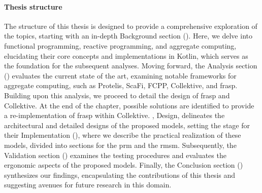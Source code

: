 \paragraph{Thesis structure}

The structure of this thesis is designed to provide a comprehensive exploration of the topics, starting with an in-depth Background section (). Here, we delve into functional programming, reactive programming, and aggregate computing, elucidating their core concepts and implementations in Kotlin, which serves as the foundation for the subsequent analyses. Moving forward, the Analysis section () evaluates the current state of the art, examining notable frameworks for aggregate computing, such as Protelis, ScaFi, FCPP, Collektive, and \ac{frasp}. Building upon this analysis, we proceed to detail the design of \ac{frasp} and Collektive. At the end of the chapter, possible solutions are identified to provide a re-implementation of \ac{frasp} within Collektive. , Design, delineates the architectural and detailed designs of the proposed models, setting the stage for their Implementation (), where we describe the practical realization of these models, divided into sections for the \ac{prm} and the \ac{rmsm}. Subsequently, the Validation section () examines the testing procedures and evaluates the ergonomic aspects of the proposed models. Finally, the Conclusion section () synthesizes our findings, encapsulating the contributions of this thesis and suggesting avenues for future research in this domain.
